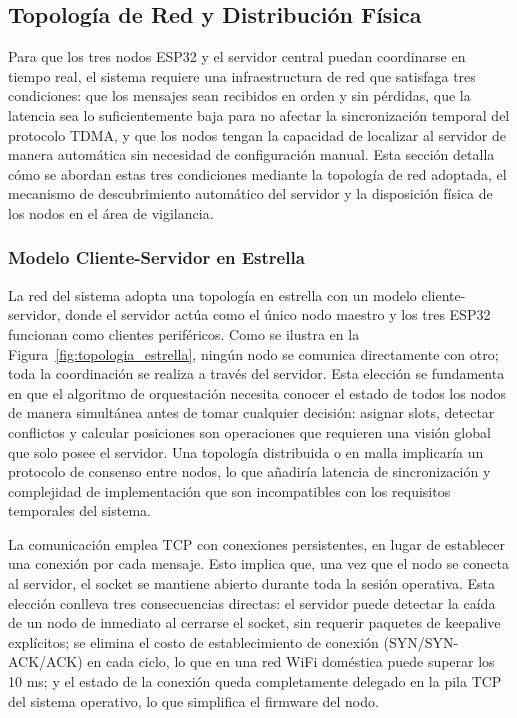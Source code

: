 
\subsection{Topología de Red y Distribución Física}

Para que los tres nodos ESP32 y el servidor central puedan coordinarse en tiempo real, el sistema requiere una infraestructura de red que satisfaga tres condiciones: que los mensajes sean recibidos en orden y sin pérdidas, que la latencia sea lo suficientemente baja para no afectar la sincronización temporal del protocolo TDMA, y que los nodos tengan la capacidad de localizar al servidor de manera automática sin necesidad de configuración manual. Esta sección detalla cómo se abordan estas tres condiciones mediante la topología de red adoptada, el mecanismo de descubrimiento automático del servidor y la disposición física de los nodos en el área de vigilancia.

\subsubsection*{Modelo Cliente-Servidor en Estrella}

La red del sistema adopta una topología en estrella con un modelo cliente-servidor, donde el servidor actúa como el único nodo maestro y los tres ESP32 funcionan como clientes periféricos. Como se ilustra en la Figura~\ref{fig:topologia_estrella}, ningún nodo se comunica directamente con otro; toda la coordinación se realiza a través del servidor. Esta elección se fundamenta en que el algoritmo de orquestación necesita conocer el estado de todos los nodos de manera simultánea antes de tomar cualquier decisión: asignar slots, detectar conflictos y calcular posiciones son operaciones que requieren una visión global que solo posee el servidor. Una topología distribuida o en malla implicaría un protocolo de consenso entre nodos, lo que añadiría latencia de sincronización y complejidad de implementación que son incompatibles con los requisitos temporales del sistema.

La comunicación emplea TCP con conexiones persistentes, en lugar de establecer una conexión por cada mensaje. Esto implica que, una vez que el nodo se conecta al servidor, el socket se mantiene abierto durante toda la sesión operativa. Esta elección conlleva tres consecuencias directas: el servidor puede detectar la caída de un nodo de inmediato al cerrarse el socket, sin requerir paquetes de keepalive explícitos; se elimina el costo de establecimiento de conexión (SYN/SYN-ACK/ACK) en cada ciclo, lo que en una red WiFi doméstica puede superar los 10 ms; y el estado de la conexión queda completamente delegado en la pila TCP del sistema operativo, lo que simplifica el firmware del nodo.

